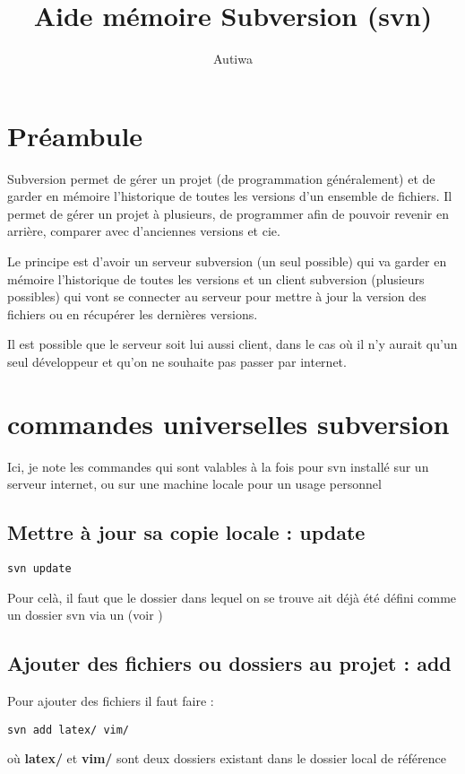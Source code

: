\documentclass[a4paper,twoside]{article}
\title{Aide mémoire Subversion (svn)}
\author{Autiwa}
\begin{document}
\tableofcontents

\clearpage

\section{Préambule}
Subversion permet de gérer un projet (de programmation généralement) et de garder en mémoire l'historique de toutes les versions d'un ensemble de fichiers. Il permet de gérer un projet à plusieurs, de programmer afin de pouvoir revenir en arrière, comparer avec d'anciennes versions et cie. 

Le principe est d'avoir un serveur subversion (un seul possible) qui va garder en mémoire l'historique de toutes les versions et un client subversion (plusieurs possibles) qui vont se connecter au serveur pour mettre à jour la version des fichiers ou en récupérer les dernières versions.

\begin{remarque}
Il est possible que le serveur soit lui aussi client, dans le cas où il n'y aurait qu'un seul développeur et qu'on ne souhaite pas passer par internet.
\end{remarque}

\section{commandes universelles subversion}
Ici, je note les commandes qui sont valables à la fois pour svn installé sur un serveur internet, ou sur une machine locale pour un usage personnel

\subsection{Mettre à jour sa copie locale : update} 
\begin{verbatim}
svn update
\end{verbatim}

Pour celà, il faut que le dossier dans lequel on se trouve ait déjà été défini comme un dossier svn via un  (voir )

\subsection{Ajouter des fichiers ou dossiers au projet : add} 
Pour ajouter des fichiers il faut faire :
\begin{verbatim}
svn add latex/ vim/ 
\end{verbatim}
où \textbf{latex/} et \textbf{vim/} sont deux dossiers existant dans le dossier local de référence
\end{document}
